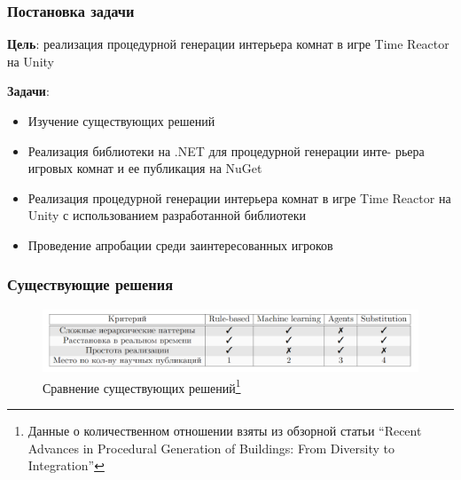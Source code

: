 \documentclass{beamer}
\begin{document}
\begin{frame}
  \frametitle{Постановка задачи}
  \textbf{Цель}: реализация процедурной генерации интерьера комнат в игре Time Reactor на Unity %

  \textbf{Задачи}:
  \begin{itemize}
    \item Изучение существующих решений
    \item Реализация библиотеки на .NET для процедурной генерации инте-
рьера игровых комнат и ее публикация на NuGet
    \item Реализация процедурной генерации интерьера комнат в игре Time
Reactor на Unity с использованием разработанной библиотеки
    \item Проведение апробации среди заинтересованных игроков
  \end{itemize}
\end{frame}
            
\begin{frame}  
  \frametitle{Существующие решения}
  \vspace*{\fill}
  \begin{center}
        \begin{figure}
            \centering
            \includegraphics[width=1.0\textwidth]{pictures/comparison_table.png}
            \caption{Сравнение существующих решений\footnote{Данные о количественном отношении взяты из обзорной статьи \enquote{Recent Advances in Procedural Generation of Buildings: From Diversity to Integration}}}
        \end{figure}
  \end{center}
  \vspace*{\fill}
\end{frame}
            
\end{document}
